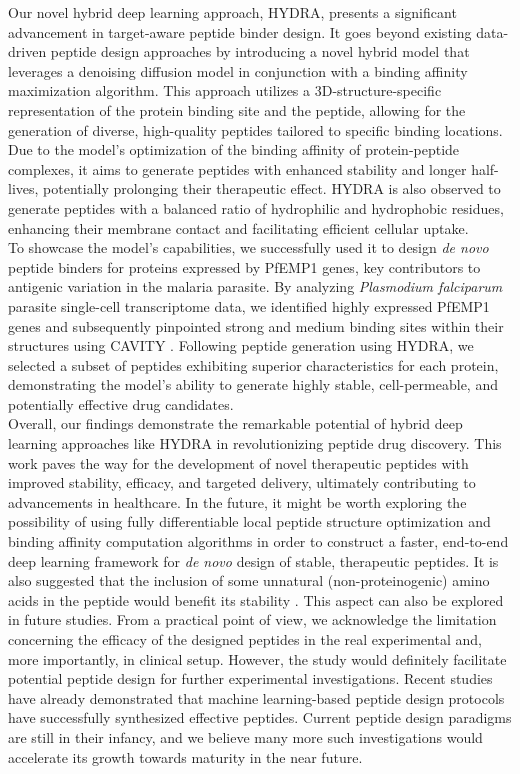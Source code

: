 Our novel hybrid deep learning approach, HYDRA, presents a significant advancement in target-aware peptide binder design. It goes beyond existing data-driven peptide design approaches by introducing a novel hybrid model that leverages a denoising diffusion model in conjunction with a binding affinity maximization algorithm. This approach utilizes a 3D-structure-specific representation of the protein binding site and the peptide, allowing for the generation of diverse, high-quality peptides tailored to specific binding locations. Due to the model's optimization of the binding affinity of protein-peptide complexes, it aims to generate peptides with enhanced stability and longer half-lives, potentially prolonging their therapeutic effect. HYDRA is also observed to generate peptides with a balanced ratio of hydrophilic and hydrophobic residues, enhancing their membrane contact and facilitating efficient cellular uptake.  \\

To showcase the model's capabilities, we successfully used it to design \textit{de novo} peptide binders for proteins expressed by PfEMP1 genes, key contributors to antigenic variation in the malaria parasite. By analyzing \textit{Plasmodium falciparum} parasite single-cell transcriptome data, we identified highly expressed PfEMP1 genes and subsequently pinpointed strong and medium binding sites within their structures using CAVITY \cite{Yuan2013}. Following peptide generation using HYDRA, we selected a subset of peptides exhibiting superior characteristics for each protein, demonstrating the model's ability to generate highly stable, cell-permeable, and potentially effective drug candidates. \\

Overall, our findings demonstrate the remarkable potential of hybrid deep learning approaches like HYDRA in revolutionizing peptide drug discovery. This work paves the way for the development of novel therapeutic peptides with improved stability, efficacy, and targeted delivery, ultimately contributing to advancements in healthcare. In the future, it might be worth exploring the possibility of using fully differentiable local peptide structure optimization and binding affinity computation algorithms \cite{wang2023fully} in order to construct a faster, end-to-end deep learning framework for \textit{de novo} design of stable, therapeutic peptides. It is also suggested that the inclusion of some unnatural (non-proteinogenic) amino acids in the peptide would benefit its stability \cite{adhikari2021reprogramming}. This aspect can also be explored in future studies. From a practical point of view, we acknowledge the limitation concerning the efficacy of the designed peptides in the real experimental and, more importantly, in clinical setup. However, the study would definitely facilitate potential peptide design for further experimental investigations. Recent studies have already demonstrated that machine learning-based peptide design protocols have successfully synthesized effective peptides. Current peptide design paradigms are still in their infancy, and we believe many more such investigations would accelerate its growth towards maturity in the near future. 
